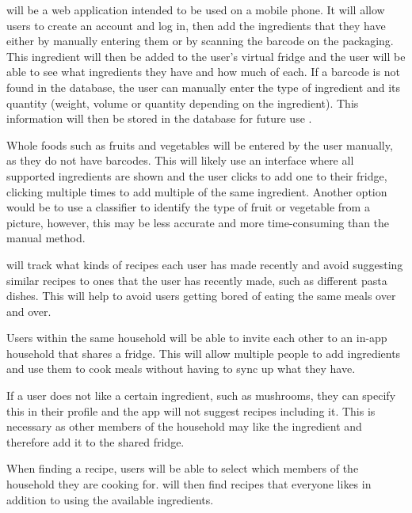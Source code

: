 \documentclass[../CHEFCookingHelperForEveryonesFridge.tex]{subfiles}
\begin{document}
\chef{} will be a web application intended to be used on a mobile phone. It will allow users to create an account and log in,
then add the ingredients that they have either by manually entering them or by scanning the barcode on the packaging.
This ingredient will then be added to the user's virtual fridge and the user will be able to see what ingredients they have and how much of each.
If a barcode is not found in the database, the user can manually enter the type of ingredient and its quantity (weight, volume or quantity depending on the ingredient).
This information will then be stored in the database for future use .

Whole foods such as fruits and vegetables will be entered by the user manually, as they do not have barcodes. This will likely use an interface where
all supported ingredients are shown and the user clicks to add one to their fridge, clicking multiple times to add multiple of the same ingredient.
Another option would be to use a classifier to identify the type of fruit or vegetable from a picture, however, this may be less accurate and more
time-consuming than the manual method.

\chef{} will track what kinds of recipes each user has made recently and avoid suggesting similar recipes
to ones that the user has recently made, such as different pasta dishes. This will help to avoid users
getting bored of eating the same meals over and over.

Users within the same household will be able to invite each other to an in-app household that shares a fridge.
This will allow multiple people to add ingredients and use them to cook meals without having to sync up
what they have.

If a user does not like a certain ingredient, such as mushrooms, they can specify this in their profile and
the \chef{} app will not suggest recipes including it. This is necessary as other members of the household
may like the ingredient and therefore add it to the shared fridge.

When finding a recipe, users will be able to select which members of the household they are cooking for.
\chef{} will then find recipes that everyone likes in addition to using the available ingredients.
\end{document}
